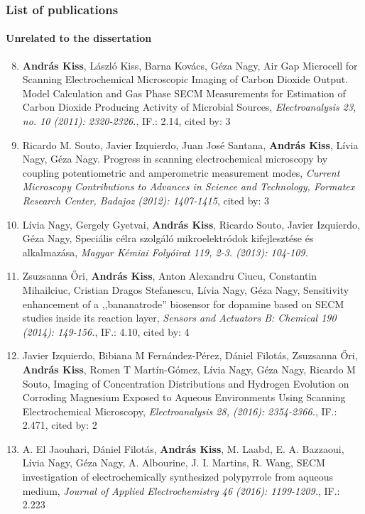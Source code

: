 \documentclass{beamer}
\begin{document}
\begin{frame}
\frametitle{List of publications}
\framesubtitle{Unrelated to the dissertation}
\tiny
\begin{enumerate}
\setcounter{enumi}{7}
\item \textbf{András Kiss}, László Kiss, Barna Kovács, Géza Nagy, Air Gap Microcell for Scanning Electrochemical Microscopic Imaging of Carbon Dioxide Output. Model Calculation and Gas Phase SECM Measurements for Estimation of Carbon Dioxide Producing Activity of Microbial Sources, \emph{Electroanalysis 23, no. 10 (2011): 2320-2326.}, IF.: 2.14, cited by: 3

\item Ricardo M. Souto, Javier Izquierdo, Juan José Santana, \textbf{András Kiss}, Lívia Nagy, Géza Nagy. Progress in scanning electrochemical microscopy by coupling potentiometric and amperometric measurement modes, \emph{Current Microscopy Contributions to Advances in Science and Technology, Formatex Research Center, Badajoz (2012): 1407-1415}, cited by: 3

\item Lívia Nagy, Gergely Gyetvai, \textbf{András Kiss}, Ricardo Souto, Javier Izquierdo, Géza Nagy, Speciális célra szolgáló mikroelektródok kifejlesztése és alkalmazása, \emph{Magyar Kémiai Folyóirat 119, 2-3. (2013): 104-109.}

\item Zsuzsanna \H{O}ri, \textbf{András Kiss}, Anton Alexandru Ciucu, Constantin Mihailciuc, Cristian Dragos Stefanescu, Lívia Nagy, Géza Nagy, Sensitivity enhancement of a ,,bananatrode'' biosensor for dopamine based on SECM studies inside its reaction layer, \emph{Sensors and Actuators B: Chemical 190 (2014): 149-156.}, IF.: 4.10, cited by: 4

\item Javier Izquierdo, Bibiana M Fernández-Pérez, Dániel Filotás, Zsuzsanna Őri, \textbf{András Kiss}, Romen T Martín-Gómez, Lívia Nagy, Géza Nagy, Ricardo M Souto, Imaging of Concentration Distributions and Hydrogen Evolution on Corroding Magnesium Exposed to Aqueous Environments Using Scanning Electrochemical Microscopy, \emph{Electroanalysis 28, (2016): 2354-2366.}, IF.: 2.471, cited by: 2

\item A. El Jaouhari,  Dániel Filotás, \textbf{András Kiss}, M. Laabd, E. A. Bazzaoui, Lívia Nagy, Géza Nagy, A. Albourine, J. I. Martins, R. Wang, SECM investigation of electrochemically synthesized polypyrrole from aqueous medium, \emph{Journal of Applied Electrochemistry 46 (2016): 1199-1209.}, IF.: 2.223
\end{enumerate}
\end{frame}
\end{document}
